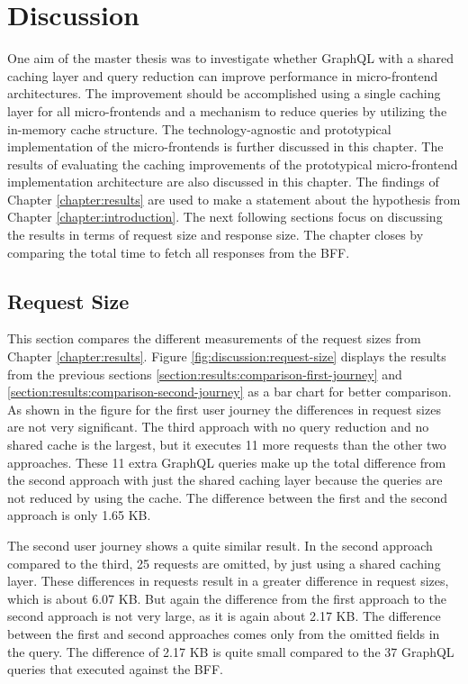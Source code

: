 \chapter{Discussion}\label{chapter:discussion}

One aim of the master thesis was to investigate whether GraphQL with a shared caching layer and query reduction can improve performance in micro-frontend architectures. The improvement should be accomplished using a single caching layer for all micro-frontends and a mechanism to reduce queries by utilizing the in-memory cache structure. The technology-agnostic and prototypical implementation of the micro-frontends is further discussed in this chapter. The results of evaluating the caching improvements of the prototypical micro-frontend implementation architecture are also discussed in this chapter. The findings of Chapter \ref{chapter:results} are used to make a statement about the hypothesis from Chapter \ref{chapter:introduction}. The next following sections focus on discussing the results in terms of request size and response size. The chapter closes by comparing the total time to fetch all responses from the \ac{BFF}.

\section{Request Size}\label{section:discussion:request-size}

This section compares the different measurements of the request sizes from Chapter \ref{chapter:results}. Figure \ref{fig:discussion:request-size} displays the results from the previous sections \ref{section:results:comparison-first-journey} and \ref{section:results:comparison-second-journey} as a bar chart for better comparison. As shown in the figure for the first user journey the differences in request sizes are not very significant. The third approach with no query reduction and no shared cache is the largest, but it executes 11 more requests than the other two approaches. These 11 extra GraphQL queries make up the total difference from the second approach with just the shared caching layer because the queries are not reduced by using the cache. The difference between the first and the second approach is only 1.65 KB. 

\bigskip

\noindent The second user journey shows a quite similar result. In the second approach compared to the third, 25 requests are omitted, by just using a shared caching layer. These differences in requests result in a greater difference in request sizes, which is about 6.07 KB. But again the difference from the first approach to the second approach is not very large, as it is again about 2.17 KB. The difference between the first and second approaches comes only from the omitted fields in the query. The difference of 2.17 KB is quite small compared to the 37 GraphQL queries that executed against the \ac{BFF}.

